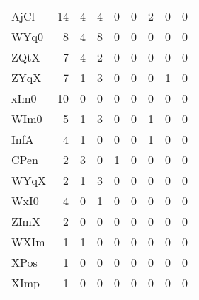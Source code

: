 \begin{table}[htbp!]
\begin{adjustbox}{width=1\textwidth}
\begin{tabular}{lrrrrrrrr}
AjCl        &            14 &           4 &             4 &          0 &              0 &         2 &             0 &              0 \\
WYq0        &             8 &           4 &             8 &          0 &              0 &         0 &             0 &              0 \\
ZQtX        &             7 &           4 &             2 &          0 &              0 &         0 &             0 &              0 \\
ZYqX        &             7 &           1 &             3 &          0 &              0 &         0 &             1 &              0 \\
xIm0        &            10 &           0 &             0 &          0 &              0 &         0 &             0 &              0 \\
WIm0        &             5 &           1 &             3 &          0 &              0 &         1 &             0 &              0 \\
InfA        &             4 &           1 &             0 &          0 &              0 &         1 &             0 &              0 \\
CPen        &             2 &           3 &             0 &          1 &              0 &         0 &             0 &              0 \\
WYqX        &             2 &           1 &             3 &          0 &              0 &         0 &             0 &              0 \\
WxI0        &             4 &           0 &             1 &          0 &              0 &         0 &             0 &              0 \\
ZImX        &             2 &           0 &             0 &          0 &              0 &         0 &             0 &              0 \\
WXIm        &             1 &           1 &             0 &          0 &              0 &         0 &             0 &              0 \\
XPos        &             1 &           0 &             0 &          0 &              0 &         0 &             0 &              0 \\
XImp        &             1 &           0 &             0 &          0 &              0 &         0 &             0 &              0 \\
\bottomrule
\end{tabular}
\end{adjustbox}
\end{table}
